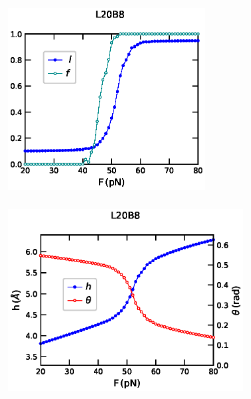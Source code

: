 \documentclass[12pt,masters,final]{UTRGVthesis}
\begin{document}
\newpage
%
\begin{figure}[!h]
        \begin{subfigure}[b]{0.49\textwidth}
                \centering
                \includegraphics[height=1.9in, width=.8\textwidth]{L20B8_Gaub_force_lf.eps}
                \caption{}
                \label{fig:L20B8lf}
        \end{subfigure}%
        \hspace{1pt}
        \hfill
        \begin{subfigure}[b]{0.49\textwidth}
                \centering
                \includegraphics[height=1.9in, width=.8\textwidth]{L20B8_Gaub_force_h_theta.eps}
                \caption{}
                \label{fig:L20B8htheta}
        \end{subfigure}%
        

\end{figure}
\end{document}
